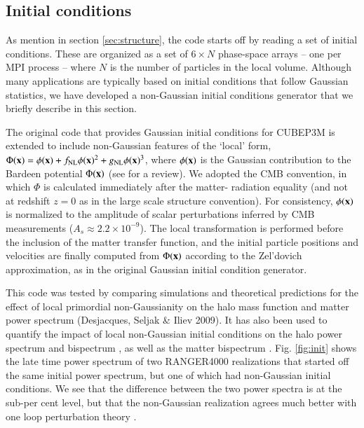 \subsection{Initial conditions}
\label{subsec:init}

As mention in section \ref{sec:structure}, the code starts off by reading a set of initial conditions.
These are organized as a set of $6 \times N$ phase-space arrays -- one per {\small MPI} process -- where $N$ is the number of particles in the
local volume. Although many applications are typically based on initial conditions that follow Gaussian statistics,
we have developed a non-Gaussian initial conditions generator that we briefly describe in this section. 


The original code that provides Gaussian initial conditions for {\small CUBEP3M} 
is extended to include non-Gaussian features of the `local' form,
$\Phi({\bf x})=\phi({\bf x})+f_{\rm NL} \phi({\bf x})^2 + g_{\rm NL} 
\phi({\bf x})^3$, where $\phi({\bf x})$ is the Gaussian contribution
to the Bardeen potential $\Phi({\bf x})$ (see \cite{2004PhR...402..103B} for a review). 
We adopted the CMB convention,
in which $\Phi$ is calculated immediately after the matter-
radiation equality (and not at redshift $z=0$ as in the large scale
structure convention). For consistency, $\phi({\bf x})$ is normalized
to the amplitude of scalar perturbations inferred by CMB measurements
($A_s\approx 2.2 \times 10^{-9}$). The local transformation is performed 
before the inclusion of the matter transfer function, and the initial 
particle positions and velocities are finally computed from $\Phi({\bf x})$ 
according to the Zel'dovich approximation, as in the original Gaussian initial condition generator.

This code was tested by comparing simulations and theoretical predictions
for the effect of local primordial non-Gaussianity on the halo mass 
function and matter power spectrum (Desjacques, Seljak \& Iliev 2009). 
It has also been used to quantify the impact of local non-Gaussian initial
conditions on the halo power spectrum \citep{2009MNRAS.396...85D,
2010PhRvD..81b3006D} and bispectrum \citep{2010MNRAS.406.1014S},
 as well as the matter bispectrum \citep{2011arXiv1111.6966S}.
Fig. \ref{fig:init} shows the late time power spectrum of two RANGER4000 realizations that started off the same initial power spectrum, 
but one of which had non-Gaussian initial conditions.
We see that the difference between the two power spectra is at the sub-per cent level, but that the non-Gaussian realization
agrees much better with one loop perturbation theory \citep{2004PhRvD..69j3513S,2008PhRvD..78l3534T}.

